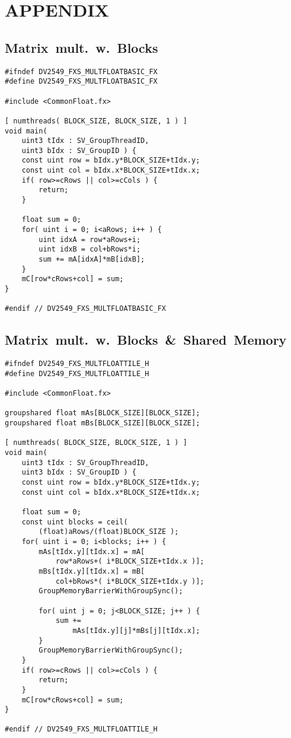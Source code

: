
\section{APPENDIX}
\label{sec:appendix}

\subsection*{Matrix~mult.~w.~Blocks}
\begin{lstlisting}
#ifndef DV2549_FXS_MULTFLOATBASIC_FX
#define DV2549_FXS_MULTFLOATBASIC_FX

#include <CommonFloat.fx>

[ numthreads( BLOCK_SIZE, BLOCK_SIZE, 1 ) ]
void main(
	uint3 tIdx : SV_GroupThreadID,
	uint3 bIdx : SV_GroupID ) {
	const uint row = bIdx.y*BLOCK_SIZE+tIdx.y;
	const uint col = bIdx.x*BLOCK_SIZE+tIdx.x;
	if( row>=cRows || col>=cCols ) {
		return;
	}
    
	float sum = 0;
	for( uint i = 0; i<aRows; i++ ) {
		uint idxA = row*aRows+i;
		uint idxB = col+bRows*i;
		sum += mA[idxA]*mB[idxB];
	}
	mC[row*cRows+col] = sum;
}

#endif // DV2549_FXS_MULTFLOATBASIC_FX
\end{lstlisting}

\newpage
\vspace*{0.08cm} %

\subsection*{Matrix~mult.~w.~Blocks~\&~Shared~Memory}
\begin{lstlisting}
#ifndef DV2549_FXS_MULTFLOATTILE_H
#define DV2549_FXS_MULTFLOATTILE_H

#include <CommonFloat.fx>

groupshared float mAs[BLOCK_SIZE][BLOCK_SIZE];
groupshared float mBs[BLOCK_SIZE][BLOCK_SIZE];

[ numthreads( BLOCK_SIZE, BLOCK_SIZE, 1 ) ]
void main(
	uint3 tIdx : SV_GroupThreadID,
	uint3 bIdx : SV_GroupID ) {
	const uint row = bIdx.y*BLOCK_SIZE+tIdx.y;
	const uint col = bIdx.x*BLOCK_SIZE+tIdx.x;
	
	float sum = 0;
	const uint blocks = ceil( 
		(float)aRows/(float)BLOCK_SIZE );
	for( uint i = 0; i<blocks; i++ ) {
		mAs[tIdx.y][tIdx.x] = mA[ 
			row*aRows+( i*BLOCK_SIZE+tIdx.x )];
		mBs[tIdx.y][tIdx.x] = mB[ 
			col+bRows*( i*BLOCK_SIZE+tIdx.y )];
		GroupMemoryBarrierWithGroupSync();

		for( uint j = 0; j<BLOCK_SIZE; j++ ) {
			sum += 
				mAs[tIdx.y][j]*mBs[j][tIdx.x];
		}
		GroupMemoryBarrierWithGroupSync();
	}
	if( row>=cRows || col>=cCols ) {
		return;
	}
	mC[row*cRows+col] = sum;
}

#endif // DV2549_FXS_MULTFLOATTILE_H

\end{lstlisting}
